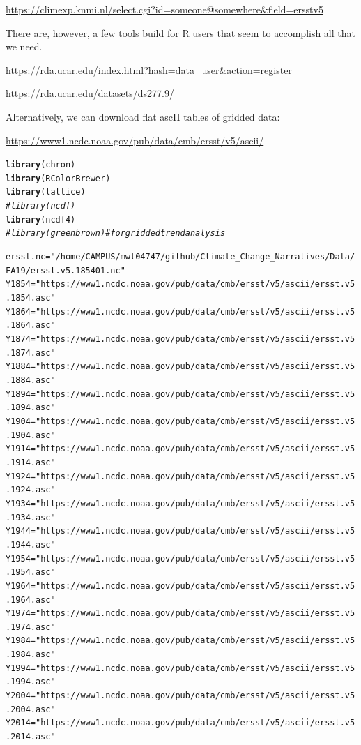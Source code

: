 \documentclass{article}\usepackage[]{graphicx}\usepackage[]{color}
\makeatletter
\newcommand{\hlstr}[1]{\textcolor[rgb]{0.192,0.494,0.8}{#1}}%
\newcommand{\hlcom}[1]{\textcolor[rgb]{0.678,0.584,0.686}{\textit{#1}}}%
\newcommand{\hlstd}[1]{\textcolor[rgb]{0.345,0.345,0.345}{#1}}%
\newcommand{\hlkwb}[1]{\textcolor[rgb]{0.69,0.353,0.396}{#1}}%
\newcommand{\hlkwd}[1]{\textcolor[rgb]{0.737,0.353,0.396}{\textbf{#1}}}%
\newenvironment{kframe}{%
 \def\at@end@of@kframe{}%
 \ifinner\ifhmode%
  \def\at@end@of@kframe{\end{minipage}}%
  \begin{minipage}{\columnwidth}%
 \fi\fi%
 \def\FrameCommand##1{\hskip\@totalleftmargin \hskip-\fboxsep
 \colorbox{shadecolor}{##1}\hskip-\fboxsep
     \hskip-\linewidth \hskip-\@totalleftmargin \hskip\columnwidth}%
 \MakeFramed {\advance\hsize-\width
   \@totalleftmargin\z@ \linewidth\hsize
   \@setminipage}}%
 {\par\unskip\endMakeFramed%
 \at@end@of@kframe}
\newenvironment{knitrout}{}{} %
\makeatother
\begin{document}
\url{https://climexp.knmi.nl/select.cgi?id=someone@somewhere&field=ersstv5}

There are, however, a few tools build for R users that seem to accomplish all that we need. 

\url{https://rda.ucar.edu/index.html?hash=data_user&action=register}

\url{https://rda.ucar.edu/datasets/ds277.9/}

Alternatively, we can download flat ascII tables of gridded data:

\url{https://www1.ncdc.noaa.gov/pub/data/cmb/ersst/v5/ascii/}


\begin{knitrout}
\color{fgcolor}\begin{kframe}
\begin{alltt}
\hlkwd{library}\hlstd{(chron)}
\hlkwd{library}\hlstd{(RColorBrewer)}
\hlkwd{library}\hlstd{(lattice)}
\hlcom{#library(ncdf)}
\hlkwd{library}\hlstd{(ncdf4)}
\hlcom{#library(greenbrown) # for gridded trend analysis}

\hlstd{ersst.nc} \hlkwb{=} \hlstr{"/home/CAMPUS/mwl04747/github/Climate_Change_Narratives/Data/FA19/ersst.v5.185401.nc"}
\hlstd{Y1854} \hlkwb{=} \hlstr{"https://www1.ncdc.noaa.gov/pub/data/cmb/ersst/v5/ascii/ersst.v5.1854.asc"}
\hlstd{Y1864} \hlkwb{=} \hlstr{"https://www1.ncdc.noaa.gov/pub/data/cmb/ersst/v5/ascii/ersst.v5.1864.asc"}
\hlstd{Y1874} \hlkwb{=} \hlstr{"https://www1.ncdc.noaa.gov/pub/data/cmb/ersst/v5/ascii/ersst.v5.1874.asc"}
\hlstd{Y1884} \hlkwb{=} \hlstr{"https://www1.ncdc.noaa.gov/pub/data/cmb/ersst/v5/ascii/ersst.v5.1884.asc"}
\hlstd{Y1894} \hlkwb{=} \hlstr{"https://www1.ncdc.noaa.gov/pub/data/cmb/ersst/v5/ascii/ersst.v5.1894.asc"}
\hlstd{Y1904} \hlkwb{=} \hlstr{"https://www1.ncdc.noaa.gov/pub/data/cmb/ersst/v5/ascii/ersst.v5.1904.asc"}
\hlstd{Y1914} \hlkwb{=} \hlstr{"https://www1.ncdc.noaa.gov/pub/data/cmb/ersst/v5/ascii/ersst.v5.1914.asc"}
\hlstd{Y1924} \hlkwb{=} \hlstr{"https://www1.ncdc.noaa.gov/pub/data/cmb/ersst/v5/ascii/ersst.v5.1924.asc"}
\hlstd{Y1934} \hlkwb{=} \hlstr{"https://www1.ncdc.noaa.gov/pub/data/cmb/ersst/v5/ascii/ersst.v5.1934.asc"}
\hlstd{Y1944} \hlkwb{=} \hlstr{"https://www1.ncdc.noaa.gov/pub/data/cmb/ersst/v5/ascii/ersst.v5.1944.asc"}
\hlstd{Y1954} \hlkwb{=} \hlstr{"https://www1.ncdc.noaa.gov/pub/data/cmb/ersst/v5/ascii/ersst.v5.1954.asc"}
\hlstd{Y1964} \hlkwb{=} \hlstr{"https://www1.ncdc.noaa.gov/pub/data/cmb/ersst/v5/ascii/ersst.v5.1964.asc"}
\hlstd{Y1974} \hlkwb{=} \hlstr{"https://www1.ncdc.noaa.gov/pub/data/cmb/ersst/v5/ascii/ersst.v5.1974.asc"}
\hlstd{Y1984} \hlkwb{=} \hlstr{"https://www1.ncdc.noaa.gov/pub/data/cmb/ersst/v5/ascii/ersst.v5.1984.asc"}
\hlstd{Y1994} \hlkwb{=} \hlstr{"https://www1.ncdc.noaa.gov/pub/data/cmb/ersst/v5/ascii/ersst.v5.1994.asc"}
\hlstd{Y2004} \hlkwb{=} \hlstr{"https://www1.ncdc.noaa.gov/pub/data/cmb/ersst/v5/ascii/ersst.v5.2004.asc"}
\hlstd{Y2014} \hlkwb{=} \hlstr{"https://www1.ncdc.noaa.gov/pub/data/cmb/ersst/v5/ascii/ersst.v5.2014.asc"}


\end{alltt}
\end{kframe}
\end{knitrout}
\end{document}
